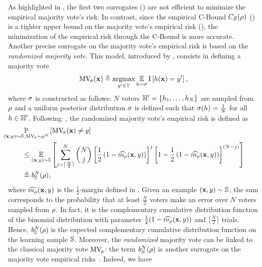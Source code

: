 As highlighted in , the first two surrogates () are not efficient to minimize the empirical majority vote's risk.
In contrast, since the empirical C-Bound $\CBound_{\dS}(\Q)$ () is a tighter upper bound on the majority vote's empirical risk (), the minimization of the empirical risk through the C-Bound is more accurate.
Another precise surrogate on the majority vote's empirical risk is based on the {\it randomized majority vote}.
This model, introduced by \citet{LacasseLavioletteMarchandTurgeonBoutin2010}, consists in defining a majority vote
\begin{align*}
    \MVQrand(\x) \defeq \argmax_{\y'\in\Y}\EE_{\h\sim\Qrand}\indic\LB \h(\x) = \y'\RB,
\end{align*}
where $\Qrand$ is constructed as follows: $N$ voters $\Hp=\{\h_1,\dots,\h_N\}$ are sampled from $\Q$ and a uniform posterior distribution $\Qrand$ is defined such that $\Qrand(\h)=\frac{1}{N}$ for all $\h\in\Hp$.
Following~\citet{LacasseLavioletteMarchandTurgeonBoutin2010}, the randomized majority vote's empirical risk is defined as
\begin{align*}
&\hspace{-1cm}\PP_{(\x,\y)\sim\dS, \MVQrand\sim\Q^N}\LB\MVQrand(\x)\ne \y\RB\\ &\le \EE_{(\x,\y)\sim\S}\LB\sum_{j=\lceil\frac{N}{2}\rceil}^N\binom{N}{j} \LB\frac{1}{2}\LP1-\OmMaQ(\x,\y)\RP\RB^j \LB1-\frac{1}{2}\LP1-\OmMaQ(\x,\y)\RP\RB^{(N-j)}\RB\\
&\defeq b_{\S}^{N}(\Q),\\
\end{align*}
where $\OmMaQ(\x,\y)$ is the $\frac{1}{2}$-margin defined in .
Given an example $(\x,\y)\sim\S$, the sum corresponds to the probability that at least $\frac{N}{2}$ voters make an error over $N$ voters sampled from $\Q$.
In fact, it is the complementary cumulative distribution function of the binomial distribution with parameter $\tfrac{1}{2}(1-\OmMaQ(\x,\y))$ and $\lceil\frac{N}{2}\rceil$ trials.
Hence, $b_{\S}^{N}(\Q)$ is the expected complementary cumulative distribution function on the learning sample $\S$.
Moreover, the {\it randomized} majority vote can be linked to the classical majority vote $\MVQ$: the term $b_{\dS}^{N}(\Q)$ is another surrogate on the majority vote empirical risks~\citep{LacasseLavioletteMarchandTurgeonBoutin2010}.
Indeed, we have

